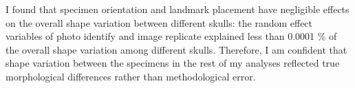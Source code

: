 	I found that specimen orientation and landmark placement have negligible effects on the overall shape variation between different skulls: the random effect variables of photo identify and image replicate explained less than 0.0001 \% of the overall shape variation among different skulls. Therefore, I am confident that shape variation between the specimens in the rest of my analyses reflected true morphological differences rather than methodological error.







